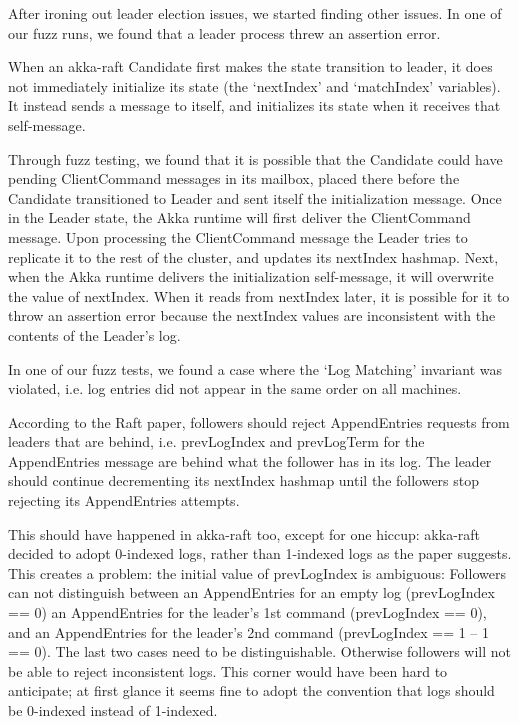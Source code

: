  After ironing out leader election issues, we started finding other issues.
 In one of our fuzz runs, we found that a leader process threw an assertion error.

When an akka-raft Candidate first makes the state transition to leader, it does not immediately initialize its
 state (the `nextIndex' and `matchIndex' variables). It instead sends a message to itself, and initializes its state when it receives that self-message.

Through fuzz testing, we found that it is possible that the Candidate could have pending
 ClientCommand messages in its mailbox, placed there before the Candidate transitioned to Leader
 and sent itself the initialization message. Once in the Leader state, the Akka runtime will first deliver
 the ClientCommand message. Upon processing the ClientCommand message the Leader tries to replicate it to
 the rest of the cluster, and updates its nextIndex hashmap. Next, when the Akka runtime delivers the
 initialization self-message, it will overwrite the value of nextIndex. When it reads from nextIndex later,
 it is possible for it to throw an assertion error because the nextIndex values are inconsistent with
 the contents of the Leader's log.


 In one of our fuzz tests,
 we found a case where the `Log Matching' invariant was violated, i.e. log entries did not appear in the same order on all machines.

According to the Raft paper, followers should reject AppendEntries requests from leaders that are behind,
 i.e. prevLogIndex and prevLogTerm for the AppendEntries message are behind what the follower has in its log.
 The leader should continue decrementing its nextIndex hashmap until the followers stop rejecting its AppendEntries attempts.

This should have happened in akka-raft too, except for one hiccup: akka-raft decided to adopt 0-indexed logs,
 rather than 1-indexed logs as the paper suggests. This creates a problem: the initial value of prevLogIndex is ambiguous:
Followers can not distinguish between an AppendEntries for an empty log (prevLogIndex == 0)
an AppendEntries for the leader's 1st command (prevLogIndex == 0), and
an AppendEntries for the leader's 2nd command (prevLogIndex == 1 – 1 == 0).
The last two cases need to be distinguishable. Otherwise followers will not be able to reject inconsistent logs. This corner would have been hard to anticipate; at first glance it seems fine to adopt the convention that logs should be 0-indexed instead of 1-indexed.

